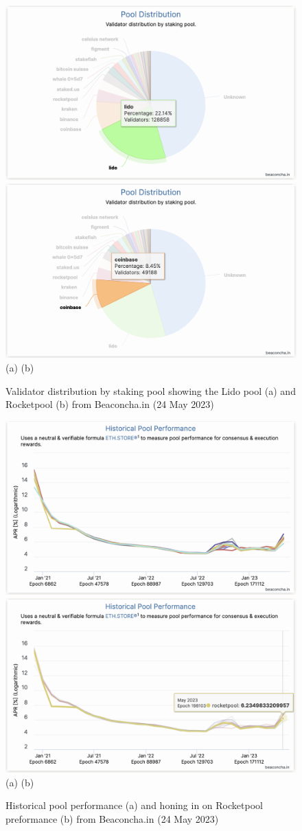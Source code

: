 \documentclass[UTF8]{article}
\begin{document}
\begin{figure}[htbp]
\begin{center}
\includegraphics[width=0.48\linewidth]{images/bchart13c}
\includegraphics[width=0.48\linewidth]{images/bchart13d} \\
(a)\hspace{160pt}        (b)\\
\caption{Validator distribution by staking pool showing the Lido pool (a) and Rocketpool (b) from Beaconcha.in (24 May 2023)}
\label{fig:chart13c}
\end{center}
\end{figure}

\begin{figure}[htbp]
\begin{center}
\includegraphics[width=0.48\linewidth]{images/bchart14a}
\includegraphics[width=0.48\linewidth]{images/bchart14b} \\
(a)\hspace{160pt}        (b)\\
\caption{Historical pool performance (a) and honing in on Rocketpool preformance (b) from Beaconcha.in (24 May 2023)}
\label{fig:chart14}
\end{center}
\end{figure}
\end{document}
